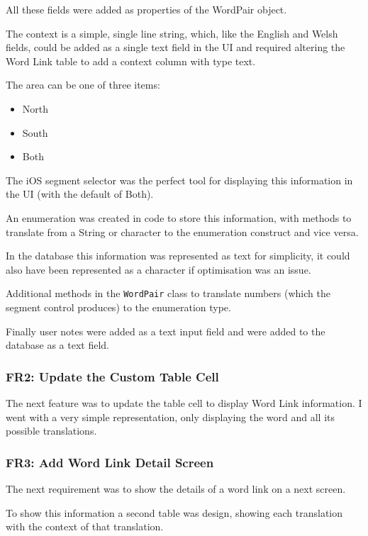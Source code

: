 \documentclass[11pt, a4paper]{article}
\begin{document}
All these fields were added as properties of the WordPair object.

The context is a simple, single line string, which, like the English and Welsh fields, could be added as a single text field in the UI and required altering the Word Link table to add a context column with type text.

The area can be one of three items:

\begin{itemize}
\item North
\item South
\item Both
\end{itemize}

The iOS segment selector was the perfect tool for displaying this information in the UI (with the default of Both).

An enumeration was created in code to store this information, with methods to translate from a String or character to the enumeration construct and vice versa.

In the database this information was represented as text for simplicity, it could also have been represented as a character if optimisation was an issue.

Additional methods in the \texttt{WordPair} class to translate numbers (which the segment control produces) to the enumeration type.

Finally user notes were added as a text input field and were added to the database as a text field.


\subsubsection{FR2: Update the Custom Table Cell}

The next feature was to update the table cell to display Word Link information. I went with a very simple representation, only displaying the word and all its possible translations.

\subsubsection{FR3: Add Word Link Detail Screen}

The next requirement was to show the details of a word link on a next screen.

To show this information a second table was design, showing each translation with the context of that translation.
\end{document}
